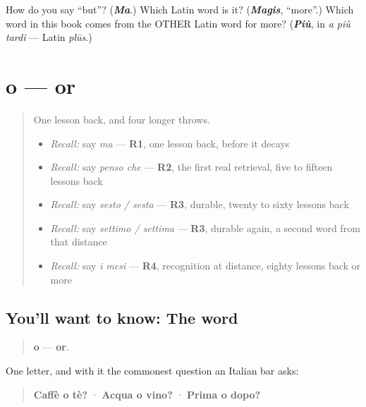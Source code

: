 \begin{tcolorbox}[breakable,colback=teal!4,colframe=teal!35!black,title={Before you move on}]
How do you say \textquotedblleft{}but\textquotedblright{}? (\emph{\textbf{Ma}}.) Which Latin word is it? (\emph{\textbf{Magis}}, \textquotedblleft{}more\textquotedblright{}.) Which word in this book comes from the OTHER Latin word for more? (\emph{\textbf{Più}}, in \emph{a più tardi} — Latin \emph{plūs}.)
\end{tcolorbox}
\section[o]{o — or}

\label{lesson:IT-C32-o}



\begin{quote}
One lesson back, and four longer throws.

\begin{itemize}
\raggedright
  \item \emph{Recall:} say \emph{ma} — \textbf{R1}, one lesson back, before it decays
  \item \emph{Recall:} say \emph{penso che} — \textbf{R2}, the first real retrieval, five to fifteen lessons back
  \item \emph{Recall:} say \emph{sesto / sesta} — \textbf{R3}, durable, twenty to sixty lessons back
  \item \emph{Recall:} say \emph{settimo / settima} — \textbf{R3}, durable again, a second word from that distance
  \item \emph{Recall:} say \emph{i mesi} — \textbf{R4}, recognition at distance, eighty lessons back or more
\end{itemize}
\end{quote}

\subsection*{You'll want to know: The word}
\begin{quote}
\textbf{o} — \textbf{or}.
\end{quote}

One letter, and with it the commonest question an Italian bar asks:

\begin{quote}
\textbf{Caffè o tè?} · \textbf{Acqua o vino?} · \textbf{Prima o dopo?}
\end{quote}

